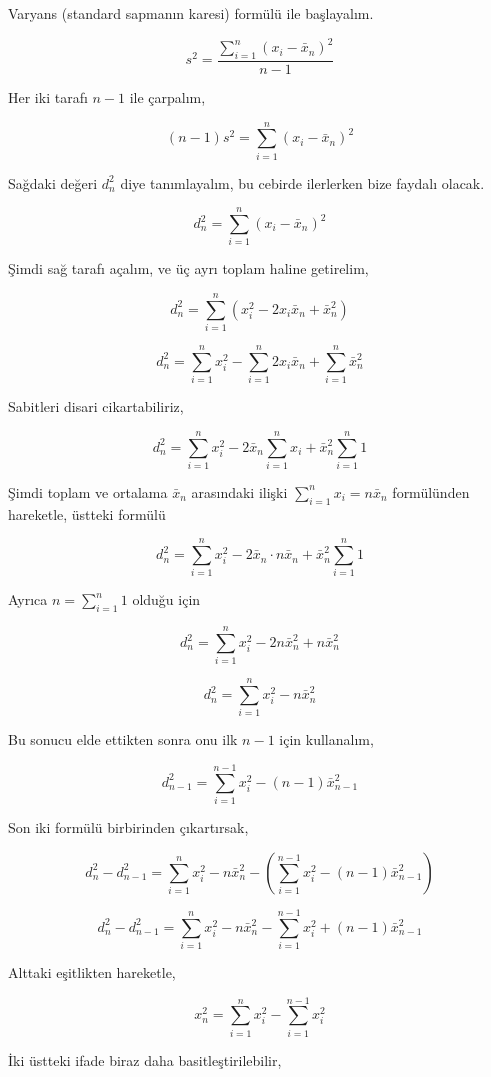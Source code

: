 \documentclass[12pt,fleqn]{article}\usepackage{../../common}
\begin{document}
Varyans (standard sapmanın karesi) formülü ile başlayalım.

$$
s^2 = \frac{ \sum_{i=1}^{n} (x_i - \bar{x}_n )^2 }{n-1}
$$

Her iki tarafı $n-1$ ile çarpalım,

$$
(n-1)s^2 =  \sum_{i=1}^{n} (x_i - \bar{x}_n )^2 
$$

Sağdaki değeri $d_n^2$ diye tanımlayalım, bu cebirde ilerlerken bize
faydalı olacak.

$$
d_n^2 =  \sum_{i=1}^{n} (x_i - \bar{x}_n )^2 
$$

Şimdi sağ tarafı açalım, ve üç ayrı toplam haline getirelim,

$$
d_n^2 = \sum_{i=1}^{n} ( x_i^2 - 2x_i\bar{x}_n + \bar{x}_n^2)
$$

$$
d_n^2 =
\sum_{i=1}^{n} x_i^2 -
\sum_{i=1}^{n} 2x_i\bar{x}_n +
\sum_{i=1}^{n} \bar{x}_n^2
$$

Sabitleri disari cikartabiliriz,

$$
d_n^2 =
\sum_{i=1}^{n} x_i^2 -
2 \bar{x}_n \sum_{i=1}^{n} x_i +
\bar{x}_n^2 \sum_{i=1}^{n} 1
$$

Şimdi toplam ve ortalama $\bar{x}_n$ arasındaki ilişki $\sum_{i=1}^{n} x_i = n \bar{x}_n$ 
formülünden hareketle, üstteki formülü

$$
d_n^2 =
\sum_{i=1}^{n} x_i^2 -
2 \bar{x}_n \cdot n \bar{x}_n +
\bar{x}_n^2 \sum_{i=1}^{n} 1
$$

Ayrıca $n = \sum_{i=1}^{n} 1$ olduğu için

$$
d_n^2 = \sum_{i=1}^{n} x_i^2 - 2 n \bar{x}_n^2 + n \bar{x}_n^2
$$

$$
d_n^2 = \sum_{i=1}^{n} x_i^2 - n \bar{x}_n^2 
$$

Bu sonucu elde ettikten sonra onu ilk $n-1$ için kullanalım,

$$
d_{n-1}^2 = \sum_{i=1}^{n-1} x_i^2 - (n-1) \bar{x}_{n-1}^2 
$$

Son iki formülü birbirinden çıkartırsak,

$$
d_n^2 - d_{n-1}^2 =
\sum_{i=1}^{n} x_i^2 - n \bar{x}_n^2  -
\left( \sum_{i=1}^{n-1} x_i^2 - (n-1) \bar{x}_{n-1}^2   \right)
$$

$$
d_n^2 - d_{n-1}^2 =
\sum_{i=1}^{n} x_i^2 - n \bar{x}_n^2  - \sum_{i=1}^{n-1} x_i^2 + (n-1) \bar{x}_{n-1}^2 
$$

Alttaki eşitlikten hareketle,

$$
x_n^2 = \sum_{i=1}^{n} x_i^2 - \sum_{i=1}^{n-1} x_i^2
$$

İki üstteki ifade biraz daha basitleştirilebilir,
\end{document}
